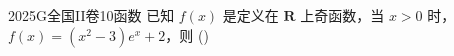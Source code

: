 
\begin{problem}{2025}{G}{全国II卷}{10}{函数}
已知 $f(x)$ 是定义在 $\mathbf{R}$ 上奇函数，当 $x>0$ 时，$f(x)=(x^2-3)e^x+2$，则
(\hspace{1cm})
\begin{choices}
\end{choices}
\end{problem}